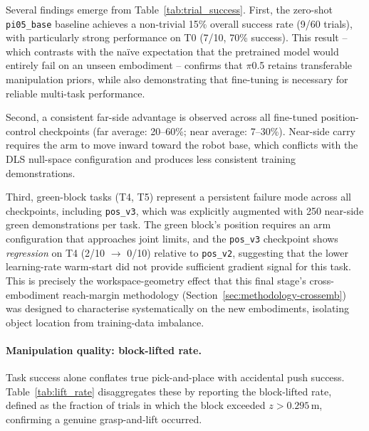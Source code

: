 \documentclass[12pt]{article}
\begin{document}
Several findings emerge from Table~\ref{tab:trial_success}. First, the zero-shot \texttt{pi05\_base} baseline achieves a non-trivial 15\% overall success rate (9/60 trials), with particularly strong performance on T0 (7/10, 70\% success). This result -- which contrasts with the na\"ive expectation that the pretrained model would entirely fail on an unseen embodiment -- confirms that $\pi$0.5 retains transferable manipulation priors, while also demonstrating that fine-tuning is necessary for reliable multi-task performance.

Second, a consistent far-side advantage is observed across all fine-tuned position-control checkpoints (far average: 20--60\%; near average: 7--30\%). Near-side carry requires the arm to move inward toward the robot base, which conflicts with the DLS null-space configuration and produces less consistent training demonstrations.

Third, green-block tasks (T4, T5) represent a persistent failure mode across all checkpoints, including \texttt{pos\_v3}, which was explicitly augmented with 250 near-side green demonstrations per task. The green block's position requires an arm configuration that approaches joint limits, and the \texttt{pos\_v3} checkpoint shows \emph{regression} on T4 (2/10 $\to$ 0/10) relative to \texttt{pos\_v2}, suggesting that the lower learning-rate warm-start did not provide sufficient gradient signal for this task. This is precisely the workspace-geometry effect that this final stage's cross-embodiment reach-margin methodology (Section~\ref{sec:methodology-crossemb}) was designed to characterise systematically on the new embodiments, isolating object location from training-data imbalance.

\paragraph{Manipulation quality: block-lifted rate.} Task success alone conflates true pick-and-place with accidental push success. Table~\ref{tab:lift_rate} disaggregates these by reporting the block-lifted rate, defined as the fraction of trials in which the block exceeded $z > 0.295$\,m, confirming a genuine grasp-and-lift occurred.
\end{document}
